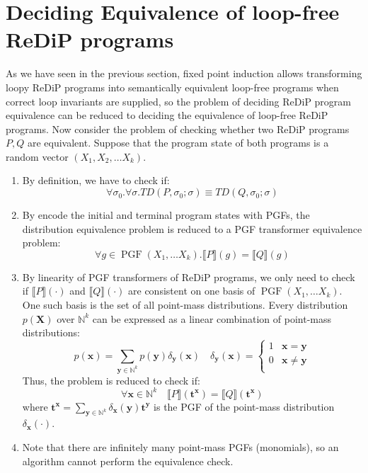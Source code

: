 \documentclass[a4paper]{article}
\DeclareMathOperator*{\PGF}{PGF}
\renewcommand{\S}[1]{ \llbracket #1 \rrbracket }
\begin{document}
\section{Deciding Equivalence of loop-free ReDiP programs}

As we have seen in the previous section, fixed point induction allows transforming loopy ReDiP programs into semantically equivalent loop-free programs when correct loop invariants are supplied,
so the problem of deciding ReDiP program equivalence can be reduced to deciding the equivalence of loop-free ReDiP programs.
Now consider the problem of checking whether two ReDiP programs \(P,Q\) are equivalent. Suppose that the program state of both programs is a random vector \((X_1,X_2,\ldots X_k)\).
\begin{enumerate}
	\item By definition, we have to check if:
	      \[
		      \forall \sigma_0 . \forall \sigma . TD(P,\sigma_0; \sigma)\equiv TD(Q,\sigma_0;\sigma)
	      \]
	\item By encode the initial and terminal program states with PGFs,
	      the distribution equivalence problem is reduced to a PGF transformer equivalence problem:
	      \[
		      \forall g\in \PGF(X_1,\ldots X_k) . \S{P}(g) = \S{Q}(g)
	      \]
	\item By linearity of PGF transformers of ReDiP programs, we only need to check if \(\S{P}(\cdot)\) and \(\S{Q}(\cdot)\) are consistent on one basis of \(\PGF(X_1,\ldots X_k)\).
	      One such basis is the set of all point-mass distributions.
	      Every distribution \(p(\mathbf{X})\) over \(\mathbb{N}^k\) can be expressed as a linear combination of point-mass distributions:
	      \[
		      p(\mathbf{x}) = \sum_{\mathbf{y}\in\mathbb{N}^k} p(\mathbf{y}) \delta_{\mathbf{y}}(\mathbf{x})
		      \quad
		      \delta_{\mathbf{y}}(\mathbf{x}) = \begin{cases}
			      1 & \mathbf{x} = \mathbf{y}    \\
			      0 & \mathbf{x} \neq \mathbf{y} \\
		      \end{cases}
	      \]
	      Thus, the problem is reduced to check if:
	      \[
		      \forall \mathbf{x} \in \mathbb{N}^k \quad \S{P}(\mathbf{t}^{\mathbf{x}}) = \S{Q}(\mathbf{t}^{\mathbf{x}})
	      \]
	      where \(\mathbf{t}^{\mathbf{x}} = \sum_{\mathbf{y}\in\mathbb{N}^k} \delta_{\mathbf{x}}(\mathbf{y}) \mathbf{t}^{\mathbf{y}}\) is the PGF of the point-mass distribution \(\delta_{\mathbf{x}}(\cdot)\).
	\item Note that there are infinitely many point-mass PGFs (monomials), so an algorithm cannot perform the equivalence check.

\end{enumerate}
\end{document}
